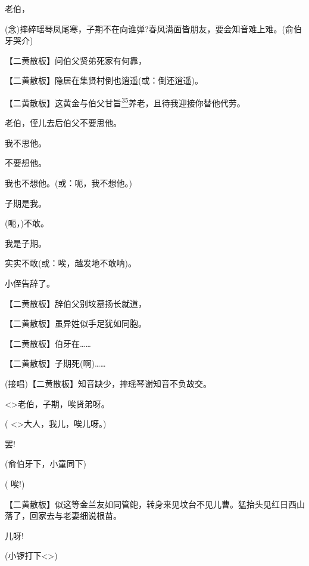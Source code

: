 { 老伯，

 ({\akai 念})摔碎瑶琴凤尾寒，子期不在向谁弹?春风满面皆朋友，要会知音难上难。(俞伯牙哭介)

 【二黄散板】问伯父贤弟死家有何靠，

 【二黄散板】隐居在集贤村倒也逍遥(或：倒还逍遥)。

 【二黄散板】这黄金与伯父甘旨\protect\hyperlink{fn35}{\textsuperscript{35}}养老，且待我迎接你替他代劳。

 老伯，侄儿去后伯父不要思他。

 我不思他。

 不要想他。

 我也不想他。(或：呃，我不想他。)

 子期是我。

 (呃，)不敢。

 我是子期。

 实实不敢(或：唉，越发地不敢呐)。

 小侄告辞了。

 【二黄散板】辞伯父别坟墓扬长就道，

 【二黄散板】虽异姓似手足犹如同胞。

 【二黄散板】伯牙在\ldots{}\ldots{}

 【二黄散板】子期死(啊)\ldots{}\ldots{}

 (接唱)【二黄散板】知音缺少，摔瑶琴谢知音不负故交。

 \textless{}\!\textgreater{}老伯，子期，唉贤弟呀。

( \textless{}\!\textgreater{}大人，我儿，唉儿呀。)

 罢!

(俞伯牙下，小童同下)

( 唉!)

 【二黄散板】似这等金兰友如同管鲍，转身来见坟台不见儿曹。猛抬头见红日西山落了，回家去与老妻细说根苗。

 儿呀!

(小锣打下\textless{}\!\textgreater{})
}

